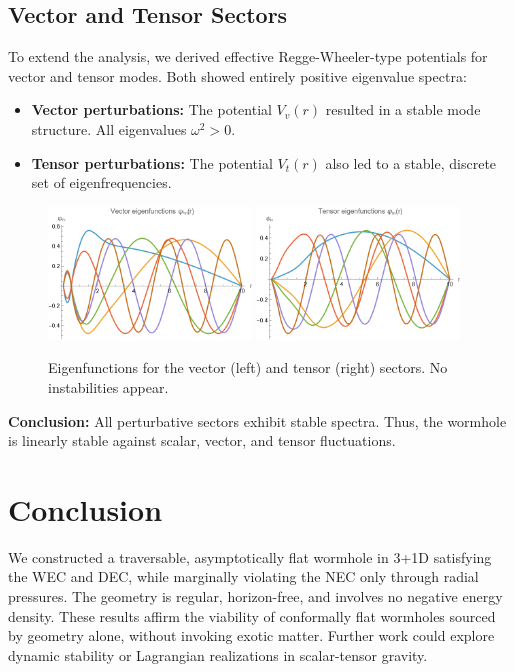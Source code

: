 \documentclass[12pt]{article}
\begin{document}
\subsection{Vector and Tensor Sectors}
To extend the analysis, we derived effective Regge-Wheeler-type potentials for vector and tensor modes. Both showed entirely positive eigenvalue spectra:

\begin{itemize}
  \item \textbf{Vector perturbations:} The potential \( V_v(r) \) resulted in a stable mode structure. All eigenvalues \( \omega^2 > 0 \).
  \item \textbf{Tensor perturbations:} The potential \( V_t(r) \) also led to a stable, discrete set of eigenfrequencies.
\end{itemize}

\begin{figure}[htbp]
    \centering
    \includegraphics[width=0.48\textwidth]{VectorEigenfunctions.png}
    \includegraphics[width=0.48\textwidth]{TensorEigenfunctions.png}
    \caption{Eigenfunctions for the vector (left) and tensor (right) sectors. No instabilities appear.}
    \label{fig:vectortensor}
\end{figure}

\textbf{Conclusion:} All perturbative sectors exhibit stable spectra. Thus, the wormhole is linearly stable against scalar, vector, and tensor fluctuations.


\section{Conclusion}
We constructed a traversable, asymptotically flat wormhole in 3+1D satisfying the WEC and DEC, while marginally violating the NEC only through radial pressures. The geometry is regular, horizon-free, and involves no negative energy density. These results affirm the viability of conformally flat wormholes sourced by geometry alone, without invoking exotic matter. Further work could explore dynamic stability or Lagrangian realizations in scalar-tensor gravity.
\end{document}
